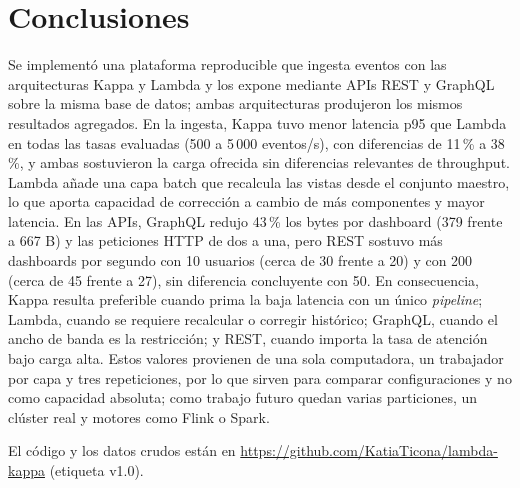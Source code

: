 \documentclass[10pt,a4paper,twocolumn]{article}
\begin{document}
\section{Conclusiones}
Se implementó una plataforma reproducible que ingesta eventos con las arquitecturas Kappa y Lambda y los
expone mediante APIs REST y GraphQL sobre la misma base de datos; ambas arquitecturas produjeron los mismos
resultados agregados. En la ingesta, Kappa tuvo menor latencia p95 que Lambda en todas las tasas evaluadas
(500 a 5\,000 eventos/s), con diferencias de 11\,\% a 38\,\%, y ambas sostuvieron la carga ofrecida sin
diferencias relevantes de throughput. Lambda añade una capa batch que recalcula las vistas desde el conjunto
maestro, lo que aporta capacidad de corrección a cambio de más componentes y mayor latencia. En las APIs,
GraphQL redujo 43\,\% los bytes por dashboard (379 frente a 667 B) y las peticiones HTTP de dos a una, pero
REST sostuvo más dashboards por segundo con 10 usuarios (cerca de 30 frente a 20) y con 200 (cerca de 45
frente a 27), sin diferencia concluyente con 50. En consecuencia, Kappa resulta preferible cuando
prima la baja latencia con un único \emph{pipeline}; Lambda, cuando se requiere recalcular o corregir
histórico; GraphQL, cuando el ancho de banda es la restricción; y REST, cuando importa la tasa de atención
bajo carga alta. Estos valores provienen de una sola computadora, un trabajador por capa y tres
repeticiones, por lo que sirven para comparar configuraciones y no como capacidad absoluta; como trabajo
futuro quedan varias particiones, un clúster real y motores como Flink o Spark.

El código y los datos crudos están en \url{https://github.com/KatiaTicona/lambda-kappa} (etiqueta v1.0).

{\footnotesize}
\end{document}
